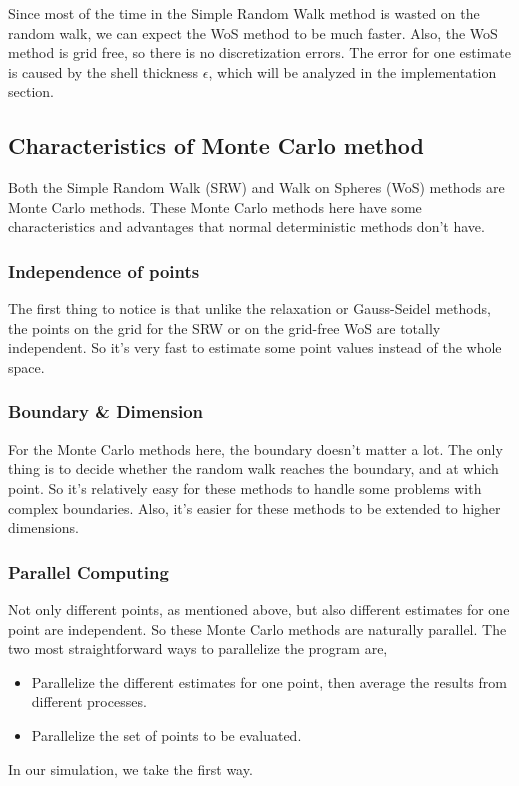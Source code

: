 \documentclass[aps, prl, preprint, groupedaddress]{revtex4-1}
\begin{document}
Since most of the time in the Simple Random Walk method is wasted on the random walk, we can expect the WoS method to be much faster. Also, the WoS method is grid free, so there is no discretization errors. The error for one estimate is caused by the shell thickness $\epsilon$, which will be analyzed in the implementation section.

\subsection{Characteristics of Monte Carlo method}

Both the Simple Random Walk (SRW) and Walk on Spheres (WoS) methods are Monte Carlo methods. These Monte Carlo methods here have some characteristics and advantages that normal deterministic methods don't have.

\subsubsection{Independence of points}

The first thing to notice is that unlike the relaxation or Gauss-Seidel methods, the points on the grid for the SRW or on the grid-free WoS are totally independent. So it's very fast to estimate some point values instead of the whole space.

\subsubsection{Boundary \& Dimension}

For the Monte Carlo methods here, the boundary doesn't matter a lot. The only thing is to decide whether the random walk reaches the boundary, and at which point. So it's relatively easy for these methods to handle some problems with complex boundaries. Also, it's easier for these methods to be extended to higher dimensions.

\subsubsection{Parallel Computing}

Not only different points, as mentioned above, but also different estimates for one point are independent. So these Monte Carlo methods are naturally parallel. The two most straightforward ways to parallelize the program are,
\begin{itemize}
    \item Parallelize the different estimates for one point, then average the results from different processes.
    \item Parallelize the set of points to be evaluated.
\end{itemize}
In our simulation, we take the first way.
\end{document}
